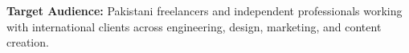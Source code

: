 \documentclass[aspectratio=169, 10pt, t]{beamer}
\begin{document}
\begin{frame}[plain]
\begin{tcbitemize}
  \end{tcbitemize}

  \vspace{0.20cm}

  \begin{tcolorbox}[colframe=hmNavyText, colback=hmNavyText, boxrule=0.75pt,
    rounded corners, left=9pt, right=9pt, top=5pt, bottom=5pt]
    \noindent\textbf{\fontsize{7.5}{9.5}\selectfont\textcolor{hmYellow}{Target Audience:}} 
    {\fontsize{7.2}{9.2}\selectfont\textcolor{hmWhite}{Pakistani freelancers and independent professionals working with international clients across engineering, design, marketing, and content creation.}}
  \end{tcolorbox}

\end{frame}
\end{document}

